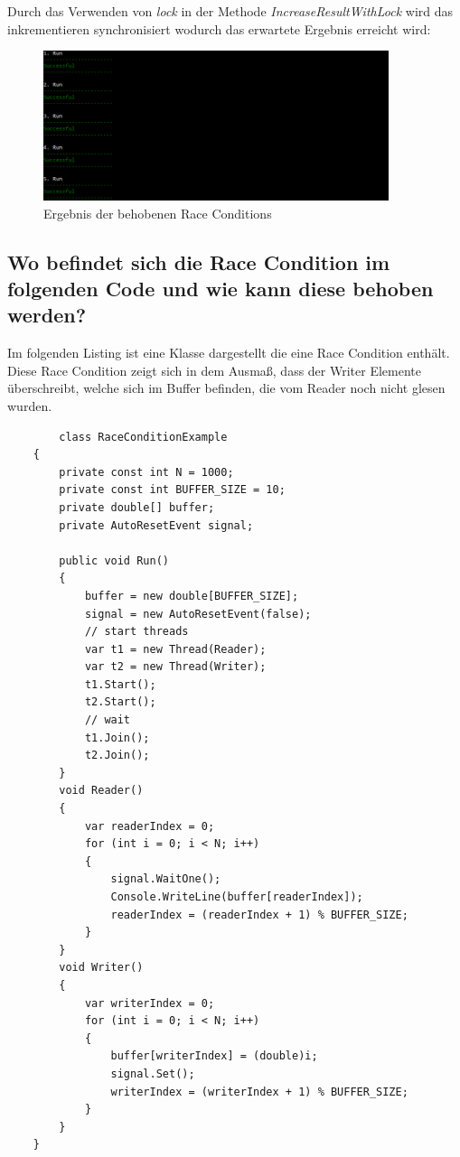 \documentclass[a4paper,ngerman]{scrartcl}
\begin{document}
Durch das Verwenden von \textit{lock} in der Methode \textit{IncreaseResultWithLock} wird das inkrementieren
synchronisiert wodurch das erwartete Ergebnis erreicht wird:

\begin{figure}[h]
	\centering
		\includegraphics[width=0.9\textwidth]{images/FixedRaceConditionsExample.PNG}
	\caption{Ergebnis der behobenen Race Conditions}
	\label{fig:FixedRaceConditionsExample}
\end{figure}

\subsection{Wo befindet sich die Race Condition im folgenden Code und wie kann diese behoben werden?}

Im folgenden Listing ist eine Klasse dargestellt die eine Race Condition enthält. Diese Race Condition zeigt sich
in dem Ausmaß, dass der Writer Elemente überschreibt, welche sich im Buffer befinden, die vom Reader noch nicht 
glesen wurden.

\begin{lstlisting}
		class RaceConditionExample
    {
        private const int N = 1000;
        private const int BUFFER_SIZE = 10;
        private double[] buffer;
        private AutoResetEvent signal;

        public void Run()
        {
            buffer = new double[BUFFER_SIZE];
            signal = new AutoResetEvent(false);
            // start threads
            var t1 = new Thread(Reader);
            var t2 = new Thread(Writer);
            t1.Start();
            t2.Start();
            // wait
            t1.Join();
            t2.Join();
        }
        void Reader()
        {
            var readerIndex = 0;
            for (int i = 0; i < N; i++)
            {
                signal.WaitOne();
                Console.WriteLine(buffer[readerIndex]);
                readerIndex = (readerIndex + 1) % BUFFER_SIZE;
            }
        }
        void Writer()
        {
            var writerIndex = 0;
            for (int i = 0; i < N; i++)
            {
                buffer[writerIndex] = (double)i;
                signal.Set();
                writerIndex = (writerIndex + 1) % BUFFER_SIZE;
            }
        }
    }
\end{lstlisting}
\end{document}
